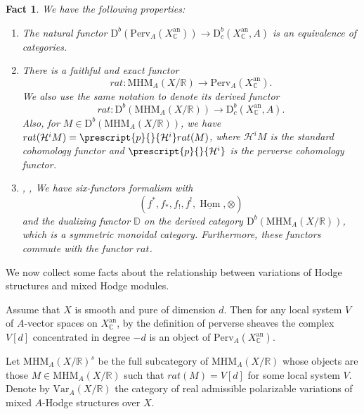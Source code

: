 \documentclass[11pt, a4paper]{amsart}
\theoremstyle{plain}
\newtheorem{fact}[theorem]{Fact}
\theoremstyle{definition}
\numberwithin{equation}{section}
\def\CC{\mathbb{C}}
\def\RR{\mathbb{R}}
\DeclareMathOperator{\Hom}{Hom}
\begin{document}
 \begin{fact}
    We have the following properties: 
    \begin{enumerate}
        \item \textnormal{\cite{Beilinson87}} The natural functor $\mathrm{D}^{b}(\mathrm{Perv}_{A}(X^{\mathrm{an}}_{\CC})) \rightarrow \mathrm{D}_{c}^{b}(X^{\mathrm{an}}_{\CC}, A)$ is an equivalence of categories. 
        \item \textnormal{\cite[Theorem 0.1]{MHM90}} There is a faithful and exact functor 
        \begin{equation*}
            rat \colon \mathrm{MHM}_{A}(X/\RR) \rightarrow \mathrm{Perv}_{A}(X^{\mathrm{an}}_{\CC}). 
        \end{equation*}
        We also use the same notation to denote its derived functor 
         \begin{equation*}
             rat \colon \mathrm{D}^{b}(\mathrm{MHM}_{A}(X/\RR)) \rightarrow \mathrm{D}_{c}^{b}(X^{\mathrm{an}}_{\CC}, A). 
         \end{equation*}
        Also, for $M \in \mathrm{D}^{b}(\mathrm{MHM}_{A}(X/\RR))$, we have $rat(\mathcal{H}^{i}M) =  \prescript{p}{}{\mathcal{H}^{i}}rat(M)$, where $\mathcal{H}^{i}M$ is the standard cohomology functor and $\prescript{p}{}{\mathcal{H}^{i}}$ is the perverse cohomology functor.
        \item \textnormal{\cite{S2}, \cite{MHM90}, {\cite[Theorem A.2.5]{HW98}}} We have six-functors formalism with 
        \begin{equation*}
            (f^{*}, f_{*}, f_{!},f^{!}, \underline{\Hom}, \otimes)
        \end{equation*}
        and the dualizing functor $\mathbb{D}$ on the derived category $\mathrm{D}^{b}(\mathrm{MHM}_{A}(X/\RR))$, which is a symmetric monoidal category. Furthermore, these functors commute with the functor $rat$.
    \end{enumerate}
 \end{fact}

 We now collect some facts about the relationship between variations of Hodge structures and mixed Hodge modules. 
 
\par Assume that $X$ is smooth and pure of dimension $d$. Then for any local system $V$ of $A$-vector spaces on $X_{\CC}^{\mathrm{an}}$, by the definition of perverse sheaves the complex $V[d]$ concentrated in degree $-d$ is an object of $\mathrm{Perv}_{A}(X^{\mathrm{an}}_{\CC})$. 
\par Let $\mathrm{MHM}_{A}(X/\RR)^{s}$ be the full subcategory of $\mathrm{MHM}_{A}(X/\RR)$ whose objects are those $M \in \mathrm{MHM}_{A}(X/\RR)$ such that $rat(M) = V[d]$ for some local system $V$. Denote by $\mathrm{Var}_{A}(X/\RR)$ the category of real admissible polarizable variations of mixed $A$-Hodge structures over $X$\cite[Definition A.2.4 b]{HW98}.
\end{document}
